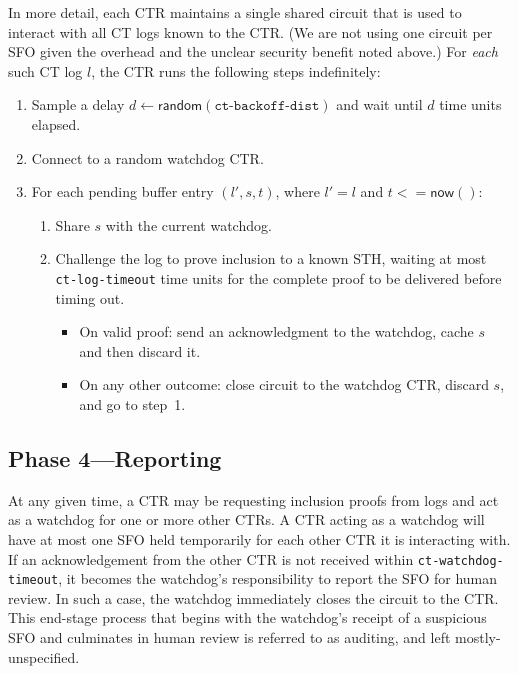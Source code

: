 In more detail, each CTR maintains a single shared circuit that is used to
interact with all CT logs known to the CTR\@. (We are not using one circuit per
SFO given the overhead and the unclear security benefit noted above.) For
\emph{each} such CT log $l$, the CTR runs the following steps indefinitely:
\begin{enumerate}
    \item\label{enm:auditing:backoff} Sample a delay $d \gets
        \mathsf{random}(\texttt{ct-backoff-dist})$ and wait until $d$ time units
        elapsed.
    \item Connect to a random watchdog CTR\@.
    \item\label{enm:auditing:loop} For each pending buffer entry $(l',s,t)$,
    where $l' = l$ and $t <= \mathsf{now}()$:
		\begin{enumerate}
			\item\label{enm:ext:auditing:watchdog} Share $s$ with the current
				watchdog.
			\item\label{enm:ext:auditing:challenge} Challenge the log to prove
                                  inclusion to a known STH, waiting at most
                                  \texttt{ct-log-timeout} time units for the
                                  complete proof to be delivered before timing
                                  out.
				\begin{itemize}
					\item\label{enm:ext:auditing:challenge:success} On valid
						proof: send an acknowledgment to the watchdog, cache $s$
						and then discard it.
					\item\label{enm:ext:auditing:challenge:fail} On any other
						outcome: close circuit to the watchdog CTR, discard $s$,
						and go to step~1.
				\end{itemize}
		\end{enumerate}
\end{enumerate}

\subsection{Phase 4---Reporting}

At any given time, a CTR may be requesting inclusion proofs from logs and act as
a watchdog for one or more other CTRs. A CTR acting as a watchdog will have at
most one SFO held temporarily for each other CTR it is interacting with. If an
acknowledgement from the other CTR is not received within
\texttt{ct-watchdog-timeout}, it becomes the watchdog's responsibility to report
the SFO for human review. In such a case, the watchdog immediately closes the
circuit to the CTR. This end-stage process that begins with the watchdog's
receipt of a suspicious SFO and culminates in human review is referred to as
auditing, and left mostly-unspecified.


